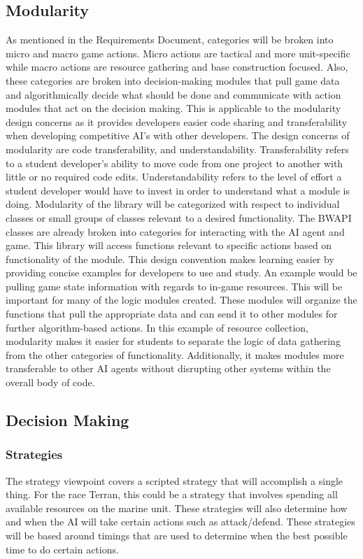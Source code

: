 \documentclass[10pt,letterpaper,onecolumn,draftclsnofoot]{IEEEtran}
\begin{document}
\subsection{Modularity}
	As mentioned in the Requirements Document, categories will be broken into micro and macro game actions. Micro actions are tactical and more unit-specific while macro actions are resource gathering and base construction focused. Also, these categories are broken into decision-making modules that pull game data and algorithmically decide what should be done and communicate with action modules that act on the decision making. This is applicable to the modularity design concerns as it provides developers easier code sharing and transferability when developing competitive AI's with other developers. 
	The design concerns of modularity are code transferability, and understandability. Transferability refers to a student developer's ability to move code from one project to another with little or no required code edits. Understandability refers to the level of effort a student developer would have to invest in order to understand what a module is doing. Modularity of the library will be categorized with respect to individual classes or small groups of classes relevant to a desired functionality. The BWAPI classes are already broken into categories for interacting with the AI agent and game. This library will access functions relevant to specific actions based on functionality of the module. This design convention makes learning easier by providing concise examples for developers to use and study.
	An example would be pulling game state information with regards to in-game resources. This will be important for many of the logic modules created. These modules will organize the functions that pull the appropriate data and can send it to other modules for further algorithm-based actions. In this example of resource collection, modularity makes it easier for students to separate the logic of data gathering from the other categories of functionality. Additionally, it makes modules more transferable to other AI agents without disrupting other systems within the overall body of code. 
\subsection{Decision Making}
\subsubsection{Strategies}
	The strategy viewpoint covers a scripted strategy that will accomplish a single thing. For the race Terran, this could be a strategy that involves spending all available resources on the marine unit. These strategies will also determine how and when the AI will take certain actions such as attack/defend. These strategies will be based around timings that are used to determine when the best possible time to do certain actions.
\end{document}
